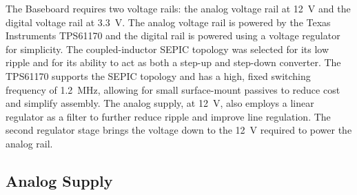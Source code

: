 \documentclass[12pt, titlepage]{tex-template}
\begin{document}
The Baseboard requires two voltage rails: the analog voltage rail at \SI{12}{\volt} and the digital voltage rail at \SI{3.3}{\volt}. The analog voltage rail is powered by the Texas Instruments TPS61170 and the digital rail is powered using a voltage regulator for simplicity. The coupled-inductor SEPIC topology was selected for its low ripple and for its ability to act as both a step-up and step-down converter. The TPS61170 supports the SEPIC topology and has a high, fixed switching frequency of \SI{1.2}{\mega\hertz}, allowing for small surface-mount passives to reduce cost and simplify assembly. The analog supply, at \SI{12}{\volt}, also employs a linear regulator as a filter to further reduce ripple and improve line regulation. The second regulator stage brings the voltage down to the \SI{12}{\volt} required to power the analog rail.

\subsection{Analog Supply}
\end{document}
